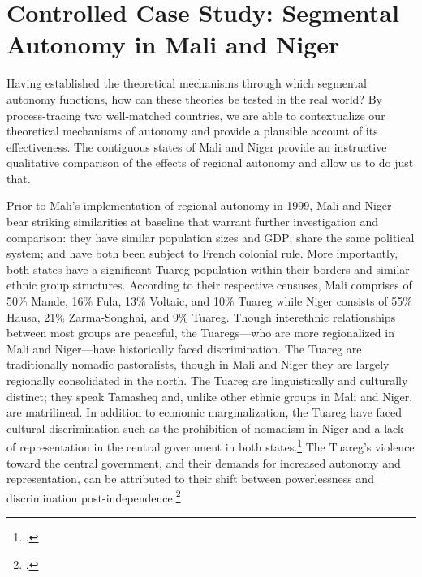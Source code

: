 \documentclass[12pt]{article}
\begin{document}
\section{Controlled Case Study: Segmental Autonomy in Mali and Niger}
Having established the theoretical mechanisms through which segmental autonomy functions, how can these theories be tested in the real world? By process-tracing two well-matched countries, we are able to contextualize our theoretical mechanisms of autonomy and provide a plausible account of its effectiveness. The contiguous states of Mali and Niger provide an instructive qualitative comparison of the effects of regional autonomy and allow us to do just that. 

Prior to Mali's implementation of regional autonomy in 1999, Mali and Niger bear striking similarities at baseline that warrant further investigation and comparison: they have similar population sizes and GDP; share the same political system; and have both been subject to French colonial rule. More importantly, both states have a significant Tuareg population within their borders and similar ethnic group structures. According to their respective censuses, Mali comprises of 50\% Mande, 16\% Fula, 13\% Voltaic, and 10\% Tuareg while Niger consists of 55\% Hausa, 21\% Zarma-Songhai, and 9\% Tuareg. Though interethnic relationships between most groups are peaceful, the Tuaregs---who are more regionalized in Mali and Niger---have historically faced discrimination. The Tuareg are traditionally nomadic pastoralists, though in Mali and Niger they are largely regionally consolidated in the north. The Tuareg are linguistically and culturally distinct; they speak Tamasheq and, unlike other ethnic groups in Mali and Niger, are matrilineal. In addition to economic marginalization, the Tuareg have faced cultural discrimination such as the prohibition of nomadism in Niger and a lack of representation in the central government in both states.\footcite{ibrahim_political_1994} The Tuareg's violence toward the central government, and their demands for increased autonomy and representation, can be attributed to their shift between powerlessness and discrimination post-independence.\footcite{vogt_integrating_2015}
\end{document}
